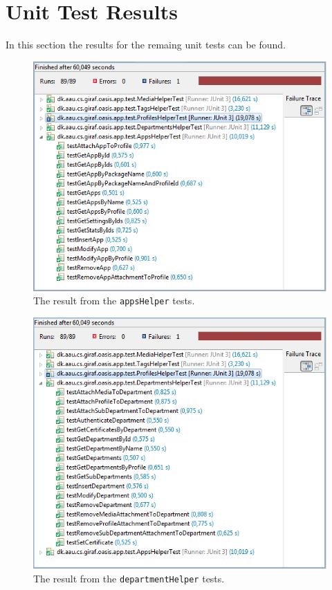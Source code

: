 \section{Unit Test Results}
\label{app:unitTestResults}
In this section the results for the remaing unit tests can be found.

\begin{figure}[htbp]
	\centering
		\includegraphics[width=\textwidth]{Images/unit_testing/app_helper_tests.PNG}
	\caption{The result from the \texttt{appsHelper} tests.}
	\label{fig:app_helper_tests}
\end{figure}

\begin{figure}[htbp]
	\centering
		\includegraphics[width=\textwidth]{Images/unit_testing/department_helper_tests.PNG}
	\caption{The result from the \texttt{departmentHelper} tests.}
	\label{fig:department_helper_tests}
\end{figure}

